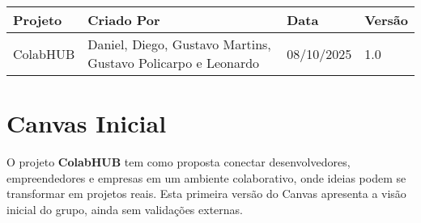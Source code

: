 \documentclass{article}
\newcommand{\hoje}{08/10/2025}
\begin{document}
\begin{table}[H]
\centering
\renewcommand{\arraystretch}{1.3}
\setlength{\tabcolsep}{10pt}
\begin{tabular}{|p{4cm}|p{7cm}|p{3cm}|p{2cm}|}
\hline
\textbf{Projeto} & \textbf{Criado Por} & \textbf{Data} & \textbf{Versão} \\
\hline
ColabHUB & Daniel, Diego, Gustavo Martins, Gustavo Policarpo e Leonardo & \hoje & 1.0 \\
\hline
\end{tabular}
\end{table}

\section*{Canvas Inicial}
O projeto \textbf{ColabHUB} tem como proposta conectar desenvolvedores, empreendedores e empresas em um ambiente colaborativo, onde ideias podem se transformar em projetos reais. Esta primeira versão do Canvas apresenta a visão inicial do grupo, ainda sem validações externas.

\vspace{0.5cm}
\end{document}

